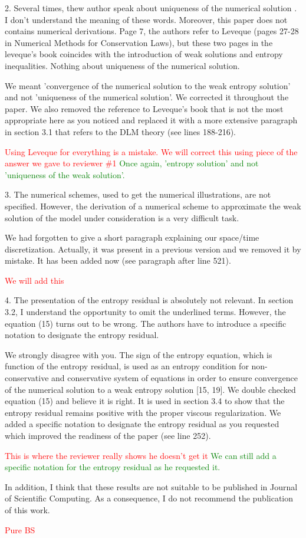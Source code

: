 \documentclass{article}
\newcommand{\tcr}[1]{\textcolor{red}{#1}}
\newcommand{\tcg}[1]{\textcolor{green}{#1}}
\begin{document}
{\color{blue}
2. Several times, thew author speak about uniqueness of the numerical solution
. I don’t understand the meaning of these words. Moreover, this
paper does not contains numerical derivations. Page 7, the authors refer
to Leveque (pages 27-28 in Numerical Methods for Conservation Laws),
but these two pages in the leveque’s book coincides with the introduction
of weak solutions and entropy inequalities. Nothing about uniqueness of
the numerical solution.}

We meant 'convergence of the numerical solution to the weak entropy solution' and not 'uniqueness of the numerical solution'. We corrected it throughout the paper.
We also removed the reference to Leveque's book that is not the most appropriate here as you noticed and replaced it with a more extensive paragraph in section 3.1 that refers to
the DLM theory (see lines 188-216).

\tcr{Using Leveque for everything is a mistake. We will correct this using
piece of the answer we gave to reviewer \#1} \tcg{Once again, 'entropy solution' and
not 'uniqueness of the weak solution'.}
\bigskip


{\color{blue}
3. The numerical schemes, used to get the numerical illustrations, are not
specified. However, the derivation of a numerical scheme to approximate
the weak solution of the model under consideration is a very difficult task.}

We had forgotten to give a short paragraph explaining our space/time discretization. Actually, it was present in a previous version and we removed it by mistake. It has been added now (see paragraph after line 521).

\tcr{We will add this}
\bigskip


{\color{blue}
4. The presentation of the entropy residual is absolutely not relevant. In
section 3.2, I understand the opportunity to omit the underlined terms.
However, the equation (15) turns out to be wrong. The authors have to
introduce a specific notation to designate the entropy residual.}

We strongly disagree with you. The sign of the entropy equation, which is function of the entropy residual, is used as an entropy condition for non-conservative and conservative system of equations in order to ensure
convergence of the numerical solution to a weak entropy solution [15, 19]. We double checked equation (15) and believe it is right. It is used in section 3.4 to show that the entropy residual remains positive with the proper
viscous regularization. We added a specific notation to designate the entropy residual as you requested which improved the readiness of the paper (see line 252).  

\tcr{This is where the reviewer really shows he doesn't get it} \tcg{We can still add 
a specific notation for the entropy residual as he requested it.}
\bigskip


{\color{blue}
In addition, I think that these results are not suitable to be published in Journal
of Scientific Computing. As a consequence, I do not recommend the publication
of this work.}

\tcr{Pure BS}
\bigskip
\end{document}
